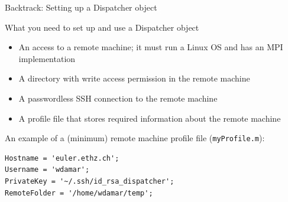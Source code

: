 \documentclass[]{rsuqbeamernew}
\begin{document}
\begin{frame}[fragile]{Backtrack: Setting up a Dispatcher object}

\begin{block}{What you need to set up and use a Dispatcher object}
\begin{itemize}
  \item An access to a remote machine; it must run a Linux OS and has an MPI implementation
  \item A directory with write access permission in the remote machine
  \item A passwordless SSH connection to the remote machine
  \item A profile file that stores required information about the remote machine 
\end{itemize}
\end{block}
  
An example of a (minimum) remote machine profile file (\texttt{myProfile.m}):
\begin{lstlisting}[basicstyle=\scriptsize]
Hostname = 'euler.ethz.ch';
Username = 'wdamar';
PrivateKey = '~/.ssh/id_rsa_dispatcher';
RemoteFolder = '/home/wdamar/temp';
\end{lstlisting}
  
\end{frame}
\end{document}
